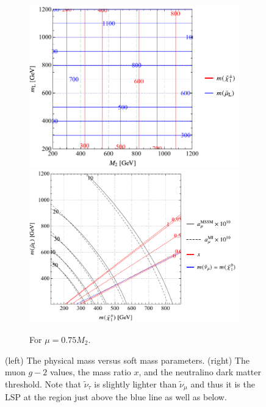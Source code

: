\documentclass[a4paper,10pt,captions=tableheading,DIV=14]{scrartcl}
\numberwithin{equation}{section}
\begin{document}
\begin{figure}[p]
\begin{subfigure}[b]{\textwidth}
 \includegraphics[scale=0.6]{../plots/plot_spectrum_tab3_massplot.pdf}
\hfill
 \includegraphics[scale=0.6]{../plots/plot_spectrum_tab3_physplot.pdf}
\caption{\label{fig:spectra-tab1} For $\mu=0.75M_2$.}
\end{subfigure}


\caption{\label{fig:spectra}(left) The physical mass versus soft mass parameters. (right) The muon $g-2$ values, the mass ratio $x$, and the neutralino dark matter threshold. Note that $\tilde\nu_\tau$ is slightly lighter than $\tilde\nu_\mu$ and thus it is the LSP at the region just above the blue line as well as below.}

\end{figure}
\end{document}
